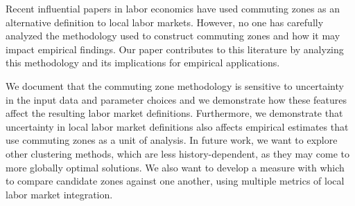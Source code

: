 Recent influential papers in labor economics have used commuting zones as an alternative definition to local labor markets. However, no one has carefully analyzed the methodology used to construct commuting zones and how it may impact empirical findings. Our paper contributes to this literature by analyzing this methodology and its implications for empirical applications.

We document that the commuting zone methodology is sensitive to uncertainty in the input data and parameter choices and we demonstrate how these features affect the resulting labor market definitions. Furthermore, we demonstrate that uncertainty in local labor market definitions also affects empirical estimates that use commuting zones as a unit of analysis. In future work, we want to explore other clustering methods, which are less history-dependent, as they may come to more globally optimal solutions. We also want to develop a measure with which to compare candidate zones against one another, using multiple metrics of local labor market integration.

